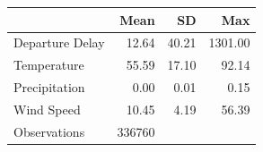 {
\def\sym#1{\ifmmode^{#1}\else\(^{#1}\)\fi}
\begin{tabular}{l*{1}{r r r}}
\hline\hline
                    &        Mean&          SD&         Max\\
\hline
Departure Delay     &       12.64&       40.21&     1301.00\\
Temperature         &       55.59&       17.10&       92.14\\
Precipitation       &        0.00&        0.01&        0.15\\
Wind Speed          &       10.45&        4.19&       56.39\\
\hline
Observations        &      336760&            &            \\
\hline\hline
\end{tabular}
}
